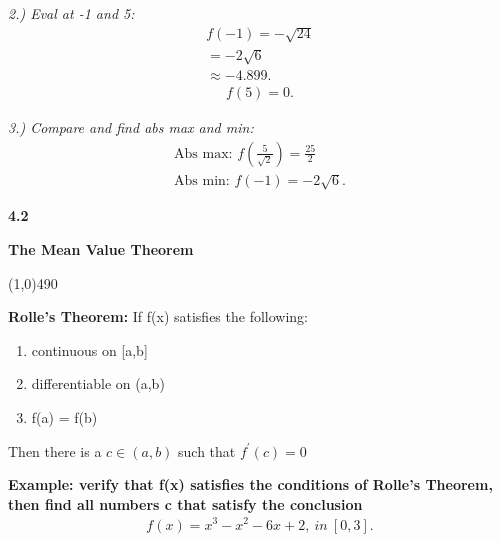 \documentclass{report}
\begin{document}
   \bigbreak \noindent 
   \textit{2.) Eval at -1 and 5:}
   \begin{align*}
     f(-1) = -\sqrt{24} \\
     = -2\sqrt{6} \\
     \approx \boxed{-4.899}
   .\end{align*}
   \begin{align*}
     f(5) = \boxed{0}
   .\end{align*}

   \bigbreak \noindent 
   \textit{3.) Compare and find abs max and min:}
   \begin{align*}
     \text{Abs max: } f(\frac{5}{\sqrt{2}}) = \frac{25}{2} \\
     \text{Abs min: } f(-1) = -2\sqrt{6}
   .\end{align*}

   \bigbreak \noindent 

   \pagebreak \bigbreak \noindent
   \begin{Large}
       \begin{mdframed}
           \begin{center}
               \textbf{4.2}
           \end{center}
       \end{mdframed}
   \end{Large}
   \begin{Large}
       \begin{center}
           \textbf{The Mean Value Theorem}
       \end{center}
   \end{Large}
   \line(1,0){490}

   \bigbreak \noindent 
   \begin{mdframed}
     \textbf{Rolle's Theorem:}
     \bigbreak \noindent 
     If f(x) satisfies the following:
     \begin{enumerate}
       \item continuous on [a,b]
        \item differentiable on (a,b)
        \item f(a) = f(b)
     \end{enumerate}
     \smallbreak \noindent
     Then there is a $c \in (a,b)$ such that $f^{\prime}(c) = 0$ 
   \end{mdframed}

   \bigbreak \noindent 
   \begin{mdframed}
     \textbf{Example: verify that f(x) satisfies the conditions of Rolle's Theorem, then find all 
       numbers c that satisfy the conclusion
     }
     \begin{align*}
       f(x) = x^{3} -x^{2} -6x + 2,\ in\ [0,3]
     .\end{align*}
   \end{mdframed}
\end{document}
